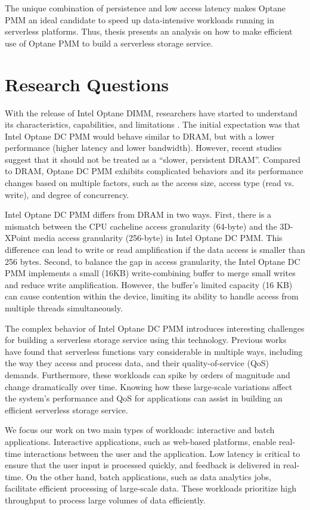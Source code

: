 The unique combination of persistence and low access latency makes Optane PMM an ideal candidate to speed up data-intensive workloads running in serverless platforms. Thus, thesis presents an analysis on how to make efficient use of Optane PMM to build a serverless storage service.

\section{Research Questions}

With the release of Intel Optane DIMM, researchers have started to understand its characteristics, capabilities, and limitations \cite{izraelevitz2019basic, yang2020empirical, wu2020ribbon}. The initial expectation was that Intel Optane DC PMM would behave similar to DRAM, but with a lower performance (higher latency and lower bandwidth). However, recent studies suggest that it should not be treated as a “slower, persistent DRAM”. Compared to DRAM, Optane DC PMM exhibits complicated behaviors and its performance changes based on multiple factors, such as the access size, access type (read vs. write), and degree of concurrency.

Intel Optane DC PMM differs from DRAM in two ways. First, there is a mismatch between the CPU cacheline access granularity (64-byte) and the 3D-XPoint media access granularity (256-byte) in Intel Optane DC PMM. This difference can lead to write or read amplification if the data access is smaller than 256 bytes. Second, to balance the gap in access granularity, the Intel Optane DC PMM implements a small (16KB) write-combining buffer to merge small writes and reduce write amplification. However, the buffer’s limited capacity (16 KB) can cause contention within the device, limiting its ability to handle access from multiple threads simultaneously.

The complex behavior of Intel Optane DC PMM introduces interesting challenges for building a serverless storage service using this technology. Previous works have found that serverless functions vary considerable in multiple ways, including the way they access and process data, and their quality-of-service (QoS) demands. Furthermore, these workloads can spike by orders of magnitude and change dramatically over time. Knowing how these large-scale variations affect the system’s performance and QoS for applications can assist in building an efficient serverless storage service.

We focus our work on two main types of workloads: interactive and batch applications. Interactive applications, such as web-based platforms, enable real-time interactions between the user and the application. Low latency is critical to ensure that the user input is processed quickly, and feedback is delivered in real-time. On the other hand, batch applications, such as data analytics jobs, facilitate efficient processing of large-scale data. These workloads prioritize high throughput to process large volumes of data efficiently.

